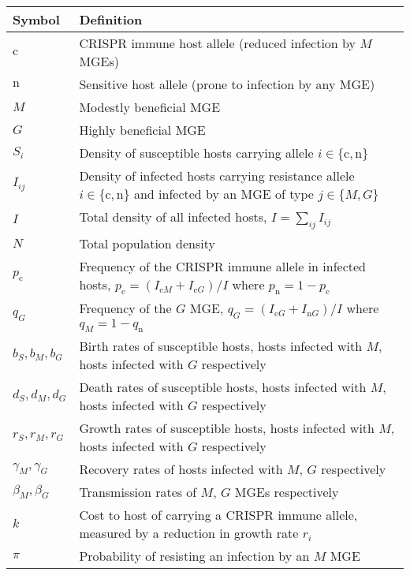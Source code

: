 \documentclass{article}
\newcommand{\badFGE}{M}
\newcommand{\goodFGE}{G}
\newcommand{\sensitive}{\mathrm{n}}
\newcommand{\immune}{\mathrm{c}}
\begin{document}
\begin{table}
    \begin{center}
        \begin{tabular}{p{2cm}p{10cm}}
\hline 
Symbol & Definition\tabularnewline
\hline 
    $\immune$ & CRISPR immune host allele (reduced infection by $\badFGE$ MGEs) \tabularnewline
    $\sensitive$ & Sensitive host allele (prone to infection by any MGE) \tabularnewline
    $\badFGE$ & Modestly beneficial MGE \tabularnewline
    $\goodFGE$ & Highly beneficial MGE \tabularnewline
    $S_{i}$ & Density of susceptible hosts carrying allele $i \in \{\immune,\sensitive\}$ \tabularnewline
    $I_{ij}$ & Density of infected hosts carrying resistance allele $i \in \{\immune,\sensitive\}$ and infected by an MGE of type $j \in \{\badFGE,\goodFGE\}$  \tabularnewline 
    $I$ & Total density of all infected hosts, $I = \sum_{ij} I_{ij}$   \tabularnewline 
    $N$ & Total population density \tabularnewline 
            $p_{\immune}$ & Frequency of the CRISPR immune allele in infected hosts, $p_{\immune} = (I_{\immune \badFGE} + I_{\immune \goodFGE})/I$ where $p_{\sensitive} = 1-p_{\immune}$ \tabularnewline
            $q_{\goodFGE}$ & Frequency of the $\goodFGE$ MGE, $q_{\goodFGE} = (I_{\immune \goodFGE} + I_{\sensitive \goodFGE})/I$ where $q_{\badFGE} = 1 - q_{\sensitive}$ \tabularnewline
            $b_{S}, b_{\badFGE}, b_{\goodFGE}$ & Birth rates of susceptible hosts, hosts infected with $\badFGE$, hosts infected with $\goodFGE$ respectively \tabularnewline
            $d_{S}, d_{\badFGE}, d_{\goodFGE}$ & Death rates of susceptible hosts, hosts infected with $\badFGE$, hosts infected with $\goodFGE$ respectively \tabularnewline
            $r_{S}, r_{\badFGE}, r_{\goodFGE}$ & Growth rates of susceptible hosts, hosts infected with $\badFGE$, hosts infected with $\goodFGE$ respectively \tabularnewline 
            $\gamma_{\badFGE}, \gamma_{\goodFGE}$ & Recovery rates of hosts infected with $\badFGE$, $\goodFGE$ respectively \tabularnewline
            $\beta_{\badFGE}, \beta_{\goodFGE}$ & Transmission rates of $\badFGE$, $\goodFGE$ MGEs respectively \tabularnewline
            $k$ & Cost to host of carrying a CRISPR immune allele, measured by a reduction in growth rate $r_{i}$ \tabularnewline
            $\pi$ & Probability of resisting an infection by an $\badFGE$ MGE \tabularnewline
            \hline 
\end{tabular}
\caption{\label{tab:notation}}
    \end{center}
\end{table}
\end{document}
